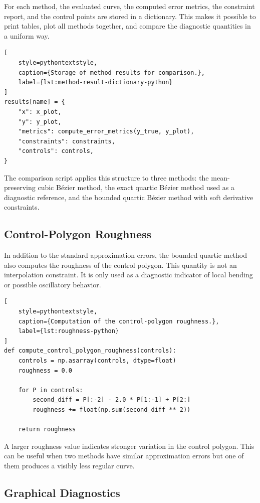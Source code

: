 \documentclass[12pt,a4paper]{article}
\begin{document}
For each method, the evaluated curve, the computed error metrics, the
constraint report, and the control points are stored in a dictionary. This
makes it possible to print tables, plot all methods together, and compare the
diagnostic quantities in a uniform way.

\begin{lstlisting}[
    style=pythontextstyle,
    caption={Storage of method results for comparison.},
    label={lst:method-result-dictionary-python}
]
results[name] = {
    "x": x_plot,
    "y": y_plot,
    "metrics": compute_error_metrics(y_true, y_plot),
    "constraints": constraints,
    "controls": controls,
}
\end{lstlisting}

The comparison script applies this structure to three methods: the
mean-preserving cubic B\'ezier method, the exact quartic B\'ezier method used
as a diagnostic reference, and the bounded quartic B\'ezier method with soft
derivative constraints.

\subsection{Control-Polygon Roughness}

In addition to the standard approximation errors, the bounded quartic method
also computes the roughness of the control polygon. This quantity is not an
interpolation constraint. It is only used as a diagnostic indicator of local
bending or possible oscillatory behavior.

\begin{lstlisting}[
    style=pythontextstyle,
    caption={Computation of the control-polygon roughness.},
    label={lst:roughness-python}
]
def compute_control_polygon_roughness(controls):
    controls = np.asarray(controls, dtype=float)
    roughness = 0.0

    for P in controls:
        second_diff = P[:-2] - 2.0 * P[1:-1] + P[2:]
        roughness += float(np.sum(second_diff ** 2))

    return roughness
\end{lstlisting}

A larger roughness value indicates stronger variation in the control polygon.
This can be useful when two methods have similar approximation errors but one
of them produces a visibly less regular curve.

\subsection{Graphical Diagnostics}
\end{document}

